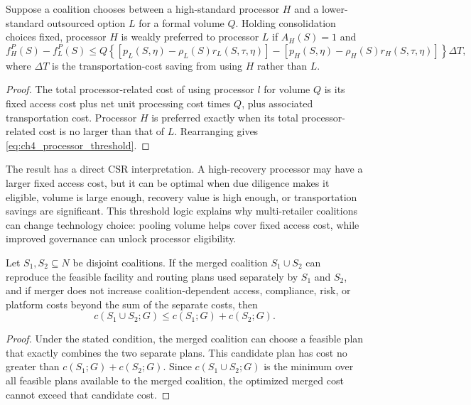 \begin{proposition}
\label{prop:ch4_processor_threshold}
Suppose a coalition chooses between a high-standard processor $H$ and a lower-standard outsourced option $L$ for a formal volume $Q$. Holding consolidation choices fixed, processor $H$ is weakly preferred to processor $L$ if $A_H(S)=1$ and
\begin{equation}
\label{eq:ch4_processor_threshold}
f_H^P(S)-f_L^P(S)
\leq
Q\left\{
\left[p_L(S,\eta)-\rho_L(S)r_L(S,\tau,\eta)\right]
-
\left[p_H(S,\eta)-\rho_H(S)r_H(S,\tau,\eta)\right]
\right\}
\Delta T,
\end{equation}
where $\Delta T$ is the transportation-cost saving from using $H$ rather than $L$.
\end{proposition}

\begin{proof}
The total processor-related cost of using processor $l$ for volume $Q$ is its fixed access cost plus net unit processing cost times $Q$, plus associated transportation cost. Processor $H$ is preferred exactly when its total processor-related cost is no larger than that of $L$. Rearranging gives \eqref{eq:ch4_processor_threshold}.
\end{proof}

The result has a direct CSR interpretation. A high-recovery processor may have a larger fixed access cost, but it can be optimal when due diligence makes it eligible, volume is large enough, recovery value is high enough, or transportation savings are significant. This threshold logic explains why multi-retailer coalitions can change technology choice: pooling volume helps cover fixed access cost, while improved governance can unlock processor eligibility.

\begin{proposition}
\label{prop:ch4_subadditivity}
Let $S_1,S_2\subseteq N$ be disjoint coalitions. If the merged coalition $S_1\cup S_2$ can reproduce the feasible facility and routing plans used separately by $S_1$ and $S_2$, and if merger does not increase coalition-dependent access, compliance, risk, or platform costs beyond the sum of the separate costs, then
\begin{equation}
\label{eq:ch4_subadditivity}
c(S_1\cup S_2;G)\leq c(S_1;G)+c(S_2;G).
\end{equation}
\end{proposition}

\begin{proof}
Under the stated condition, the merged coalition can choose a feasible plan that exactly combines the two separate plans. This candidate plan has cost no greater than $c(S_1;G)+c(S_2;G)$. Since $c(S_1\cup S_2;G)$ is the minimum over all feasible plans available to the merged coalition, the optimized merged cost cannot exceed that candidate cost.
\end{proof}

